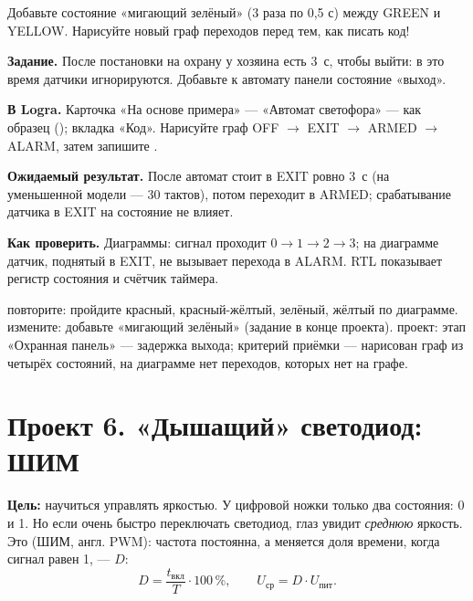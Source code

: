 \begin{taskbox}
Добавьте состояние «мигающий зелёный» (3 раза по 0,5 с) между GREEN и
YELLOW. Нарисуйте новый граф переходов перед тем, как писать код!
\end{taskbox}

\begin{diybox}
\textbf{Задание.} После постановки на охрану у хозяина есть 3~с, чтобы выйти: в это время датчики игнорируются. Добавьте к автомату панели состояние «выход».

\textbf{В Logra.} Карточка «На основе примера» --- «Автомат светофора» --- как образец (); вкладка «Код». Нарисуйте граф OFF $\to$ EXIT $\to$ ARMED $\to$ ALARM, затем запишите .

\textbf{Ожидаемый результат.} После  автомат стоит в EXIT ровно 3~с (на уменьшенной модели --- 30 тактов), потом переходит в ARMED; срабатывание датчика в EXIT на состояние не влияет.

\textbf{Как проверить.} Диаграммы: сигнал  проходит $0\to 1\to 2\to 3$; на диаграмме датчик, поднятый в EXIT, не вызывает перехода в ALARM. RTL показывает регистр состояния и счётчик таймера.

 повторите: пройдите красный, красный-жёлтый, зелёный, жёлтый по диаграмме.  измените: добавьте «мигающий зелёный» (задание в конце проекта).  проект: этап «Охранная панель» --- задержка выхода; критерий приёмки --- нарисован граф из четырёх состояний, на диаграмме нет переходов, которых нет на графе.
\end{diybox}

\section{Проект 6. «Дышащий» светодиод: ШИМ}

\textbf{Цель:} научиться управлять яркостью. У цифровой ножки только два
состояния: 0 и 1. Но если очень быстро переключать светодиод, глаз увидит
\emph{среднюю} яркость. Это  (ШИМ, англ. PWM):
частота постоянна, а меняется доля времени, когда сигнал равен 1,
---  $D$:
\[
  D = \frac{t_\text{вкл}}{T}\cdot 100\,\%, \qquad
  U_\text{ср} = D \cdot U_\text{пит}.
\]

